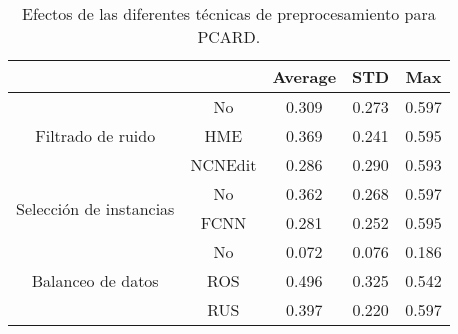\begin{table}
    \centering
    \begin{tabular}{cc|c|c|c|}
    \cline{3-5}
    \multicolumn{1}{l}{\textbf{}} & \textbf{} & \multicolumn{1}{c|}{\textbf{Average}} & \multicolumn{1}{c|}{\textbf{STD}} & \textbf{Max} \\ \hline
    \multicolumn{1}{|c|}{\multirow{3}{*}{Filtrado de ruido}}       & No        & 0.309   & 0.273
    & 0.597        \\ \cline{2-5} 
    \multicolumn{1}{|c|}{}  & HME       & 0.369   &  0.241
    & 0.595        \\ \cline{2-5} 
    \multicolumn{1}{|c|}{}  & NCNEdit   & 0.286   &  0.290
    & 0.593        \\ \hline
    \multicolumn{1}{|c|}{\multirow{2}{*}{Selección de instancias}} & No        & 0.362   & 0.268
    & 0.597        \\ \cline{2-5} 
    \multicolumn{1}{|c|}{}  & FCNN      & 0.281   & 0.252
    & 0.595        \\ \hline
    \multicolumn{1}{|c|}{\multirow{3}{*}{Balanceo de datos}}       & No        & 0.072   & 0.076
    & 0.186        \\ \cline{2-5} 
    \multicolumn{1}{|c|}{}  & ROS       & 0.496   & 0.325
    & 0.542        \\ \cline{2-5} 
    \multicolumn{1}{|c|}{}  & RUS       & 0.397   & 0.220
    & 0.597        \\ \hline
    \end{tabular}
    \caption{Efectos de las diferentes técnicas de preprocesamiento para PCARD.}
    \label{pcard}
\end{table}

